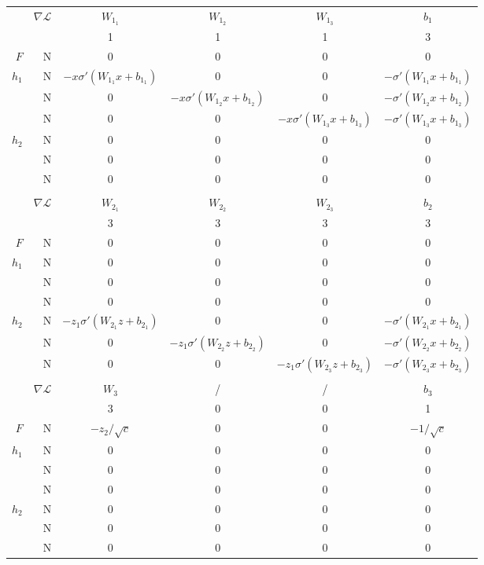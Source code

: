 \documentclass[11pt]{article}
\begin{document}
\begin{tabular}{r r | c c c c}\hline
& $\nabla\mathcal{L}$ & $W_{1_1}$ & $W_{1_2}$ & $W_{1_3}$ & $b_1$ \\
& & 1 & 1 & 1 & 3 \\ \hline
$F$ & N & 0 & 0 & 0 & 0 \\ \hline
$h_1$ & N & 		$-x\sigma'(W_{1_1}x+b_{1_1})$ & 0 & 0 & $-\sigma'(W_{1_1}x+b_{1_1})$ \\
      & N & 0 & 	$-x\sigma'(W_{1_2}x+b_{1_2})$ & 0 &  	$-\sigma'(W_{1_2}x+b_{1_2})$ \\
      & N & 0 & 0 & $-x\sigma'(W_{1_3}x+b_{1_3})$ &  		$-\sigma'(W_{1_3}x+b_{1_3})$ \\ \hline
$h_2$ & N & 0 & 0 & 0 & 0 \\
      & N & 0 & 0 & 0 & 0 \\
      & N & 0 & 0 & 0 & 0 \\ \hline \\ \hline
& $\nabla\mathcal{L}$ & $W_{2_1}$ & $W_{2_2}$ & $W_{2_3}$ & $b_2$ \\
& & 3 & 3 & 3 & 3 \\ \hline
$F$ & N & 0 & 0 & 0 & 0 \\ \hline
$h_1$ & N & 0 & 0 & 0 & 0 \\
      & N & 0 & 0 & 0 & 0 \\
      & N & 0 & 0 & 0 & 0 \\ \hline
$h_2$ & N & 		$-z_1\sigma'(W_{2_1}z + b_{2_1})$ & 0 & 0 & $-\sigma'(W_{2_1}x+b_{2_1})$ \\
      & N & 0 & 	$-z_1\sigma'(W_{2_2}z + b_{2_2})$ & 0 & 	$-\sigma'(W_{2_2}x+b_{2_2})$ \\
      & N & 0 & 0 & $-z_1\sigma'(W_{2_3}z + b_{2_3})$ & 		$-\sigma'(W_{2_3}x+b_{2_3})$ \\ \hline \\ \hline
& $\nabla\mathcal{L}$ & $W_3$ & / & /& $b_3$ \\
& & 3 & 0 & 0 & 1 \\ \hline
$F$ & N & $-z_2/\sqrt{c}$ & 0 & 0 & $-1/\sqrt{c}$ \\ \hline
$h_1$ & N & 0 & 0 & 0 & 0 \\
      & N & 0 & 0 & 0 & 0 \\
      & N & 0 & 0 & 0 & 0 \\ \hline
$h_2$ & N & 0 & 0 & 0 & 0 \\
      & N & 0 & 0 & 0 & 0 \\
      & N & 0 & 0 & 0 & 0 \\ \hline
      
\end{tabular}
\end{document}
